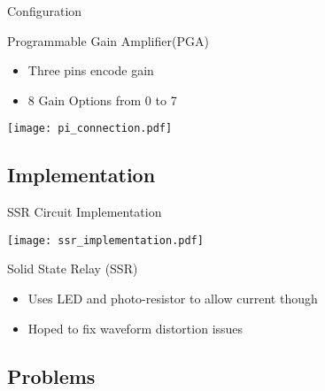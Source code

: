 \begin{frame}{Configuration}
  \begin{block}{Programmable Gain Amplifier(PGA)}
  \begin{itemize}
    \item Three pins encode gain
    \item 8 Gain Options from 0 to 7
  \end{itemize}
  \end{block}




  \begin{center}
  \texttt{[image: pi\_connection.pdf]}
  \end{center}

\end{frame}

\subsection{Implementation}

\begin{frame}{SSR Circuit Implementation}
  \begin{center}
  \texttt{[image: ssr\_implementation.pdf]}
  \end{center}

  \begin{block}{Solid State Relay (SSR)}
  \begin{itemize}
    \item Uses LED and photo-resistor to allow current though
    \item Hoped to fix waveform distortion issues
  \end{itemize}
  \end{block}
\end{frame}

\subsection{Problems}

